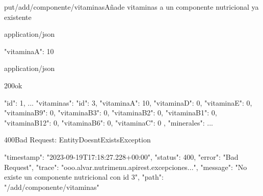 \begin{apiRoute}{put}{/add/componente/vitaminas}{Añade vitaminas a un componente nutricional ya existente}
	\begin{routeParameter}
	\end{routeParameter}
	
	\begin{routeRequest}{application/json}
		\begin{routeRequestBody}
{
	"vitaminaA": 10
}
		\end{routeRequestBody}
	\end{routeRequest}
	\begin{routeResponse}{application/json}
		\begin{routeResponseItem}{200}{ok}
			\begin{routeResponseItemBody}
{
    "id": 1,
    ...
    "vitaminas": {
        "id": 3,
        "vitaminaA": 10,
        "vitaminaD": 0,
        "vitaminaE": 0,
        "vitaminaB9": 0,
        "vitaminaB3": 0,
        "vitaminaB2": 0,
        "vitaminaB1": 0,
        "vitaminaB12": 0,
        "vitaminaB6": 0,
        "vitaminaC": 0
    },
    "minerales": 
    	{...}
}
			\end{routeResponseItemBody}
		\end{routeResponseItem}
		\begin{routeResponseItem}{400}{Bad Request: EntityDoesntExistsException}
			\begin{routeResponseItemBody}
{
    "timestamp": "2023-09-19T17:18:27.228+00:00",
    "status": 400,
    "error": "Bad Request",
    "trace": "ooo.alvar.nutrimenu.apirest.excepciones...",
    "message": "No existe un componente nutricional con id 3",
    "path": "/add/componente/vitaminas"
}
			\end{routeResponseItemBody}
		\end{routeResponseItem}
	\end{routeResponse}
\end{apiRoute}

